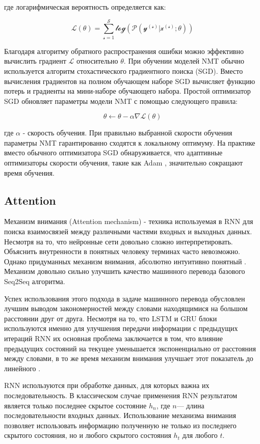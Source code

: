     где логарифмическая вероятность определяется как:
    
    $$
      \mathscr{L(\theta)=\sum_{s=1}^S log(P(y^{(s)}|x^{(s)};\theta))}  
    $$
    
    Благодаря алгоритму обратного распространения ошибки можно эффективно вычислить градиент $\mathscr{L}$ относительно $\theta$. При обучении моделей NMT обычно используется алгоритм стохастического градиентного поиска (SGD). Вместо вычисления градиентов на полном обучающем наборе SGD вычисляет функцию потерь и градиенты на мини-наборе обучающего набора. Простой оптимизатор SGD обновляет параметры модели NMT с помощью следующего правила:
    
    $$
        \theta \leftarrow \theta - \alpha \nabla \mathscr{L}(\theta)
    $$
    
    где $\alpha$ - скорость обучения. При правильно выбранной скорости обучения параметры NMT гарантированно сходятся к локальному оптимуму. На практике вместо обычного оптимизатора SGD обнаруживается, что адаптивные оптимизаторы скорости обучения, такие как Adam \cite{14}, значительно сокращают время обучения.
	
	\subsection{Attention}
	
	Механизм внимания (Attention mechanism) - техника используемая в RNN для поиска взаимосвязей между различными частями входных и выходных данных. Несмотря на то, что нейронные сети довольно сложно интерпретировать. Объяснить внутренности в понятных человеку терминах часто невозможно. Однако придуманных механизм внимания, абсолютно интуитивно понятный \cite{16}. Механизм довольно сильно улучшить качество машинного перевода базового Seq2Seq алгоритма.

    Успех использования этого подхода в задаче машинного перевода обусловлен лучшим выводом закономерностей между словами находящимися на большом расстоянии друг от друга. Несмотря на то, что LSTM и GRU блоки используются именно для улучшения передачи информации с предыдущих итераций RNN их основная проблема заключается в том, что влияние предыдущих состояний на текущее уменьшается экспоненциально от расстояния между словами, в то же время механизм внимания улучшает этот показатель до линейного \cite{17}.
    
    RNN используются при обработке данных, для которых важна их последовательность. В классическом случае применения RNN результатом является только последнее скрытое состояние $h_n$, где $n$— длина последовательности входных данных. Использование механизма внимания позволяет использовать информацию полученную не только из последнего скрытого состояния, но и любого скрытого состояния $h_t$ для любого $t$.
    

